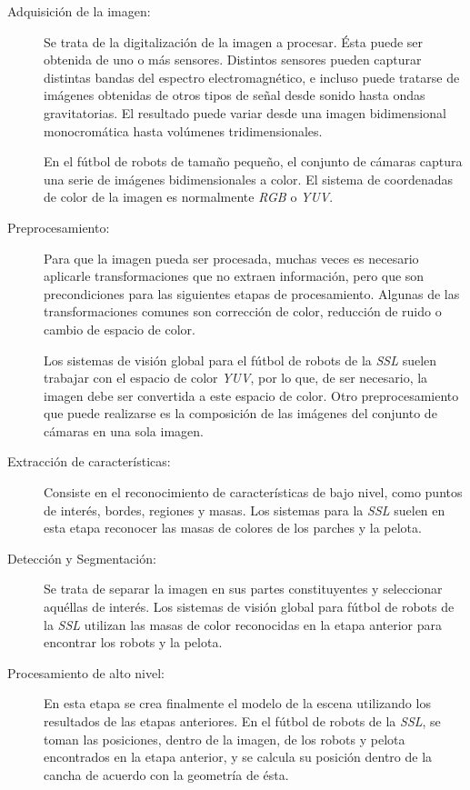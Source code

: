 \begin{description}

	\item[Adquisición de la imagen:] Se trata de la digitalización de la
		imagen a procesar. Ésta puede ser obtenida de uno o más
		sensores. Distintos sensores pueden capturar distintas bandas
		del espectro electromagnético, e incluso puede tratarse de
		imágenes obtenidas de otros tipos de señal desde sonido hasta
		ondas gravitatorias. El resultado puede variar desde una imagen
		bidimensional monocromática hasta volúmenes tridimensionales.

		En el fútbol de robots de tamaño pequeño, el conjunto de cámaras
		captura una serie de imágenes bidimensionales a color. El
		sistema de coordenadas de color de la imagen es normalmente
		\emph{RGB} o \emph{YUV}.

	\item[Preprocesamiento:] Para que la imagen pueda ser procesada, muchas
		veces es necesario aplicarle transformaciones que no extraen
		información, pero que son precondiciones para las siguientes
		etapas de procesamiento. Algunas de las transformaciones comunes
		son corrección de color, reducción de ruido o cambio de espacio
		de color.

		Los sistemas de visión global para el fútbol de robots de la
		\emph{SSL} suelen trabajar con el espacio de color \emph{YUV},
		por lo que, de ser necesario, la imagen debe ser convertida a
		este espacio de color. Otro preprocesamiento que puede
		realizarse es la composición de las imágenes del conjunto de
		cámaras en una sola imagen.

	\item[Extracción de características:] Consiste en el reconocimiento de
		características de bajo nivel, como puntos de interés, bordes,
		regiones y masas. Los sistemas para la \emph{SSL} suelen en esta
		etapa reconocer las masas de colores de los parches y la pelota.

	\item[Detección y Segmentación:] Se trata de separar la imagen en sus
		partes constituyentes y seleccionar aquéllas de interés. Los
		sistemas de visión global para fútbol de robots de la \emph{SSL}
		utilizan las masas de color reconocidas en la etapa anterior
		para encontrar los robots y la pelota.

	\item[Procesamiento de alto nivel:] En esta etapa se crea finalmente el
		modelo de la escena utilizando los resultados de las etapas
		anteriores. En el fútbol de robots de la \emph{SSL}, se toman
		las posiciones, dentro de la imagen, de los robots y pelota
		encontrados en la etapa anterior, y se calcula su posición
		dentro de la cancha de acuerdo con la geometría de ésta.


\end{description}
